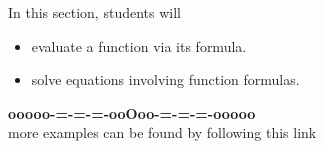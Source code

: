 \documentclass{ximera}
\begin{document}
\begin{sectionOutcomes}
In this section, students will 

\begin{itemize}
\item evaluate a function via its formula.
\item solve equations involving function formulas.
\end{itemize}
\end{sectionOutcomes}

















\begin{onlineOnly}
\begin{center}
\textbf{\textcolor{green!50!black}{ooooo-=-=-=-ooOoo-=-=-=-ooooo}} \\

more examples can be found by following this link\\ 

\end{center}
\end{onlineOnly}
\end{document}
